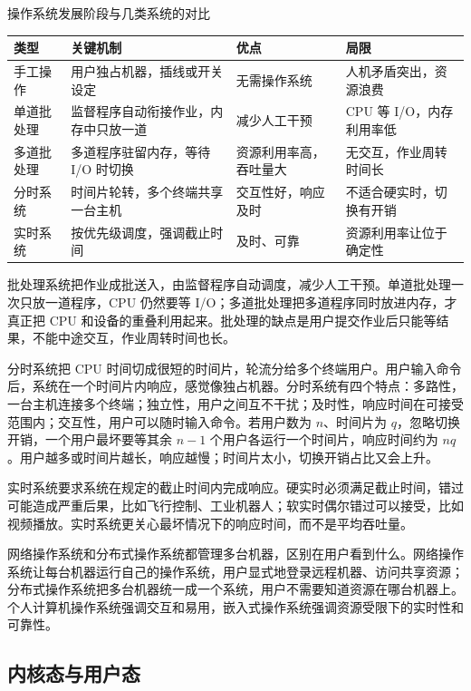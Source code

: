 \begin{tablebox}{操作系统发展阶段与几类系统的对比}
\centering
\small
\begin{tabularx}{\linewidth}{|p{2.1cm}|p{4.0cm}|X|p{3.2cm}|}
\hline
类型 & 关键机制 & 优点 & 局限 \\
\hline
手工操作 & 用户独占机器，插线或开关设定 & 无需操作系统 & 人机矛盾突出，资源浪费 \\
\hline
单道批处理 & 监督程序自动衔接作业，内存中只放一道 & 减少人工干预 & CPU 等 I/O，内存利用率低 \\
\hline
多道批处理 & 多道程序驻留内存，等待 I/O 时切换 & 资源利用率高，吞吐量大 & 无交互，作业周转时间长 \\
\hline
分时系统 & 时间片轮转，多个终端共享一台主机 & 交互性好，响应及时 & 不适合硬实时，切换有开销 \\
\hline
实时系统 & 按优先级调度，强调截止时间 & 及时、可靠 & 资源利用率让位于确定性 \\
\hline
\end{tabularx}
\end{tablebox}

批处理系统把作业成批送入，由监督程序自动调度，减少人工干预。单道批处理一次只放一道程序，CPU 仍然要等 I/O；多道批处理把多道程序同时放进内存，才真正把 CPU 和设备的重叠利用起来。批处理的缺点是用户提交作业后只能等结果，不能中途交互，作业周转时间也长。

分时系统把 CPU 时间切成很短的时间片，轮流分给多个终端用户。用户输入命令后，系统在一个时间片内响应，感觉像独占机器。分时系统有四个特点：多路性，一台主机连接多个终端；独立性，用户之间互不干扰；及时性，响应时间在可接受范围内；交互性，用户可以随时输入命令。若用户数为 $n$、时间片为 $q$，忽略切换开销，一个用户最坏要等其余 $n-1$ 个用户各运行一个时间片，响应时间约为 $nq$。用户越多或时间片越长，响应越慢；时间片太小，切换开销占比又会上升。

实时系统要求系统在规定的截止时间内完成响应。硬实时必须满足截止时间，错过可能造成严重后果，比如飞行控制、工业机器人；软实时偶尔错过可以接受，比如视频播放。实时系统更关心最坏情况下的响应时间，而不是平均吞吐量。

网络操作系统和分布式操作系统都管理多台机器，区别在用户看到什么。网络操作系统让每台机器运行自己的操作系统，用户显式地登录远程机器、访问共享资源；分布式操作系统把多台机器统一成一个系统，用户不需要知道资源在哪台机器上。个人计算机操作系统强调交互和易用，嵌入式操作系统强调资源受限下的实时性和可靠性。

\subsection{内核态与用户态}

